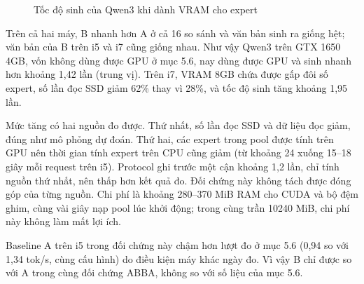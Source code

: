 \begin{figure}[htbp]
\centering
{}
\caption{Tốc độ sinh của Qwen3 khi dành VRAM cho expert}
\label{fig:vram_pool_bars}
\par{}
\end{figure}

Trên cả hai máy, B nhanh hơn A ở cả 16 so sánh và văn bản sinh ra giống hệt; văn bản của B trên i5 và i7 cũng giống nhau. Như vậy Qwen3 trên GTX 1650 4GB, vốn không dùng được GPU ở mục 5.6, nay dùng được GPU và sinh nhanh hơn khoảng 1,42 lần (trung vị). Trên i7, VRAM 8GB chứa được gấp đôi số expert, số lần đọc SSD giảm 62\% thay vì 28\%, và tốc độ sinh tăng khoảng 1,95 lần.

Mức tăng có hai nguồn đo được. Thứ nhất, số lần đọc SSD và dữ liệu đọc giảm, đúng như mô phỏng dự đoán. Thứ hai, các expert trong pool được tính trên GPU nên thời gian tính expert trên CPU cũng giảm (từ khoảng 24 xuống 15--18 giây mỗi request trên i5). Protocol ghi trước một cận khoảng 1,2 lần, chỉ tính nguồn thứ nhất, nên thấp hơn kết quả đo. Đối chứng này không tách được đóng góp của từng nguồn. Chi phí là khoảng 280--370 MiB RAM cho CUDA và bộ đệm ghim, cùng vài giây nạp pool lúc khởi động; trong cùng trần 10240 MiB, chi phí này không làm mất lợi ích.

Baseline A trên i5 trong đối chứng này chậm hơn lượt đo ở mục 5.6 (0,94 so với 1,34 tok/s, cùng cấu hình) do điều kiện máy khác ngày đo. Vì vậy B chỉ được so với A trong cùng đối chứng ABBA, không so với số liệu của mục 5.6.

